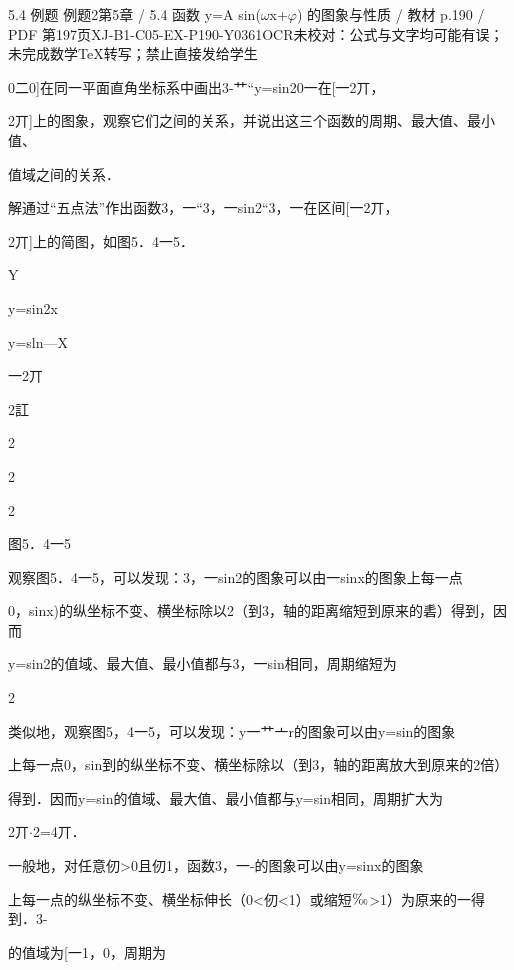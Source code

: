 \begin{bankitem}{5.4 例题 例题2}{第5章 / 5.4 函数 y=A sin(\ensuremath{\omega}x+\ensuremath{\varphi}) 的图象与性质 / 教材 p.190 / PDF 第197页}{XJ-B1-C05-EX-P190-Y0361}{OCR未校对：公式与文字均可能有误；未完成数学TeX转写；禁止直接发给学生}
\begin{ocrdraft}
\par
0二0]在同一平面直角坐标系中画出3-艹“y=sin20一在[一2丌，
\par
2丌]上的图象，观察它们之间的关系，并说出这三个函数的周期、最大值、最小值、
\par
值域之间的关系．
\par
解通过“五点法”作出函数3，一“3，一sin2“3，一在区间[一2丌，
\par
2丌]上的简图，如图5．4一5．
\par
Y
\par
y=sin2x
\par
y=sln—X
\par
一2丌
\par
2訌
\par
2
\par
2
\par
2
\par
图5．4一5
\par
观察图5．4一5，可以发现：3，一sin2的图象可以由一sinx的图象上每一点
\par
0，sinx)的纵坐标不变、横坐标除以2（到3，轴的距离缩短到原来的砉）得到，因而
\par
y=sin2的值域、最大值、最小值都与3，一sin相同，周期缩短为
\par
2
\par
类似地，观察图5，4一5，可以发现：y一艹亠r的图象可以由y=sin的图象
\par
上每一点0，sin到的纵坐标不变、横坐标除以（到3，轴的距离放大到原来的2倍）
\par
得到．因而y=sin的值域、最大值、最小值都与y=sin相同，周期扩大为
\par
2丌\ensuremath{\cdot}2=4丌．
\par
一般地，对任意仞>0且仞1，函数3，一-的图象可以由y=sinx的图象
\par
上每一点的纵坐标不变、横坐标伸长（0<仞<1）或缩短\ensuremath{\text{\textperthousand}}>1）为原来的一得到．3-
\par
的值域为[一1，0，周期为
\end{ocrdraft}
\end{bankitem}
